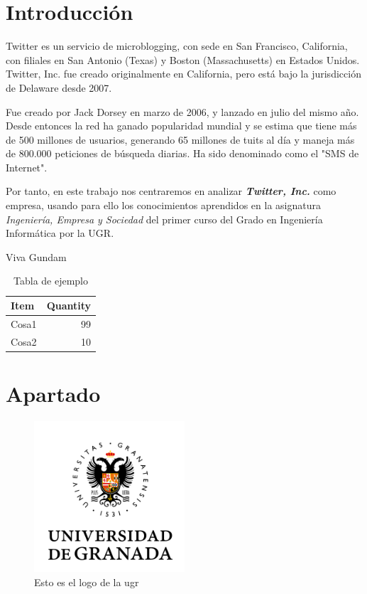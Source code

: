 \documentclass[12pt, spanish]{article}
\begin{document}

\tableofcontents
\pagebreak


\section{Introducción}

Twitter es un servicio de microblogging, con sede en San Francisco, California, con filiales en San Antonio (Texas) y Boston (Massachusetts) en Estados Unidos. Twitter, Inc. fue creado originalmente en California, pero está bajo la jurisdicción de Delaware desde 2007. 

Fue creado por Jack Dorsey en marzo de 2006, y lanzado en julio del mismo año. Desde entonces la red ha ganado popularidad mundial y se estima que tiene más de 500 millones de usuarios, generando 65 millones de tuits al día y maneja más de 800.000 peticiones de búsqueda diarias. Ha sido denominado como el "SMS de Internet".

Por tanto, en este trabajo nos centraremos en analizar \textbf{\textit{Twitter, Inc.}} como empresa, usando para ello los conocimientos aprendidos en la asignatura \textit{Ingeniería, Empresa y Sociedad} del primer curso del Grado en Ingeniería Informática por la UGR.

Viva Gundam

\begin{table}[!htb]
\centering
\begin{tabular}{l|r}
Item & Quantity \\\hline
Cosa1 & 99 \\
Cosa2 & 10
\end{tabular}
\caption{\label{tab:widgets}Tabla de ejemplo}
\end{table}

\newpage

\section{Apartado}

\begin{figure}[!htb]
\centering
\includegraphics[width=0.5\textwidth]{ugr.png}
\caption{\label{fig:frog}Esto es el logo de la ugr}
\end{figure}

\newpage





\end{document}
